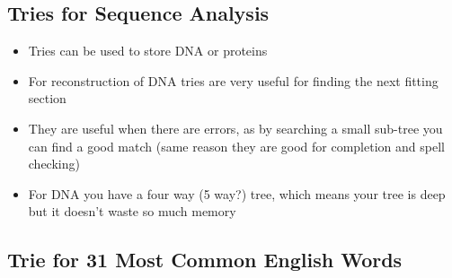 
\begin{slide}
\section{Tries for Sequence Analysis}

\begin{PauseHighLight}
  \begin{itemize}
  \item Tries can be used to store DNA or proteins\pause
  \item For reconstruction of DNA tries are very useful for finding the
    next fitting section\pause
  \item They are useful when there are errors, as by searching a small
    sub-tree you can find a good match (same reason they are good for
    completion and spell checking)\pause
  \item For DNA you have a four way (5 way?) tree, which means your tree
    is deep but it doesn't waste so much memory\pause
  \end{itemize}
\end{PauseHighLight}

\end{slide}



\begin{slide}
\section[-2]{Trie for 31 Most Common English Words}
\pause
\pb
{}
\begin{center}
  \pause
\end{center}
\end{slide}


